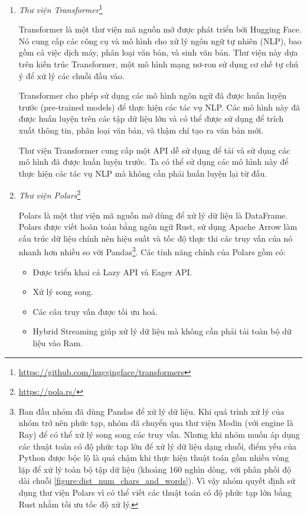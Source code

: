 \begin{enumerate}
    \item \textit{Thư viện Transformer}\footnote{\url{https://github.com/huggingface/transformers}}

          Transformer là một thư viện mã nguồn mở được phát triển bởi Hugging Face. Nó cung cấp các công cụ và mô hình cho xử lý ngôn ngữ tự nhiên (NLP), bao gồm cả việc dịch máy, phân loại văn bản, và sinh văn bản. Thư viện này dựa trên kiến trúc Transformer, một mô hình mạng nơ-ron sử dụng cơ chế tự chú ý để xử lý các chuỗi đầu vào.

          Transformer cho phép sử dụng các mô hình ngôn ngữ đã được huấn luyện trước (pre-trained models) để thực hiện các tác vụ NLP. Các mô hình này đã được huấn luyện trên các tập dữ liệu lớn và có thể được sử dụng để trích xuất thông tin, phân loại văn bản, và thậm chí tạo ra văn bản mới.

          Thư viện Transformer cung cấp một API dễ sử dụng để tải và sử dụng các mô hình đã được huấn luyện trước. Ta có thể sử dụng các mô hình này để thực hiện các tác vụ NLP mà không cần phải huấn luyện lại từ đầu.

    \item \textit{Thư viện Polars}\footnote{\url{https://pola.rs/}}

          Polars là một thư viện mã nguồn mở dùng để xử lý dữ liệu là DataFrame. Polars được viết hoàn toàn bằng ngôn ngữ Rust, sử dụng Apache Arrow làm cấu trúc dữ liệu chính nên hiệu suất và tốc độ thực thi các truy vấn của nó nhanh hơn nhiều so với Pandas\footnote{Ban đầu nhóm đã dùng Pandas để xử lý dữ liệu. Khi quá trình xử lý của nhóm trở nên phức tạp, nhóm đã chuyển qua thư viện Modin (với engine là Ray) để có thể xử lý song song các truy vấn. Nhưng khi nhóm muốn áp dụng các thuật toán có độ phức tạp lớn để xử lý dữ liệu dạng chuỗi, điểm yếu của Python được bộc lộ là quá chậm khi thực hiện thuật toán gồm nhiều vòng lặp để xử lý toàn bộ tập dữ liệu (khoảng 160 nghìn dòng, với phân phối độ dài chuỗi \ref{figure:dist_num_chars_and_words}). Vì vậy nhóm quyết định sử dụng thư viện Polars vì có thể viết các thuật toán có độ phức tạp lớn bằng Rust nhằm tối ưu tốc độ xử lý.}. Các tính năng chính của Polars gồm có:
          \begin{itemize}
              \item Được triển khai cả Lazy API và Eager API.
              \item Xử lý song song.
              \item Các câu truy vấn được tối ưu hoá.
              \item Hybrid Streaming giúp xử lý dữ liệu mà không cần phải tải toàn bộ dữ liệu vào Ram.
          \end{itemize}


\end{enumerate}
